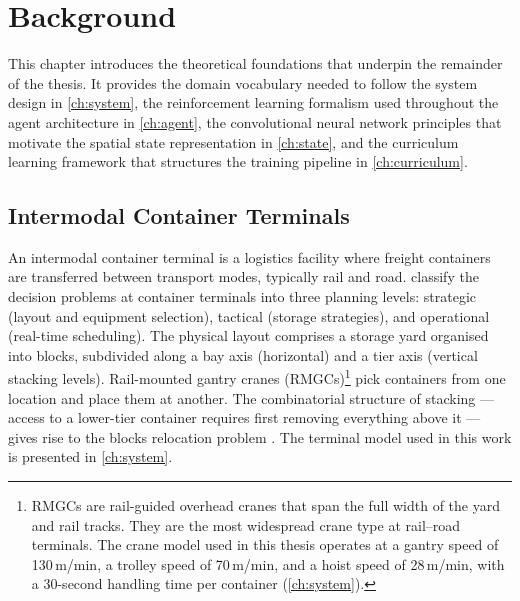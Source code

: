 \chapter{Background}
\label{ch:background}

This chapter introduces the theoretical foundations that underpin the remainder of the thesis. It provides the domain vocabulary needed to follow the system design in \cref{ch:system}, the reinforcement learning formalism used throughout the agent architecture in \cref{ch:agent}, the convolutional neural network principles that motivate the spatial state representation in \cref{ch:state}, and the curriculum learning framework that structures the training pipeline in \cref{ch:curriculum}.

\section{Intermodal Container Terminals}
\label{sec:bg:terminals}

An intermodal container terminal is a logistics facility where freight containers are transferred between transport modes, typically rail and road. \textcite{vis2003transshipment} classify the decision problems at container terminals into three planning levels: strategic (layout and equipment selection), tactical (storage strategies), and operational (real-time scheduling). The physical layout comprises a storage yard organised into blocks, subdivided along a bay axis (horizontal) and a tier axis (vertical stacking levels). Rail-mounted gantry cranes (RMGCs)\footnote{RMGCs are rail-guided overhead cranes that span the full width of the yard and rail tracks. They are the most widespread crane type at rail--road terminals. The crane model used in this thesis operates at a gantry speed of 130\,m/min, a trolley speed of 70\,m/min, and a hoist speed of 28\,m/min, with a 30-second handling time per container (\cref{ch:system}).} pick containers from one location and place them at another. The combinatorial structure of stacking --- access to a lower-tier container requires first removing everything above it --- gives rise to the blocks relocation problem \cite{caserta2009binary}. The terminal model used in this work is presented in \cref{ch:system}.

